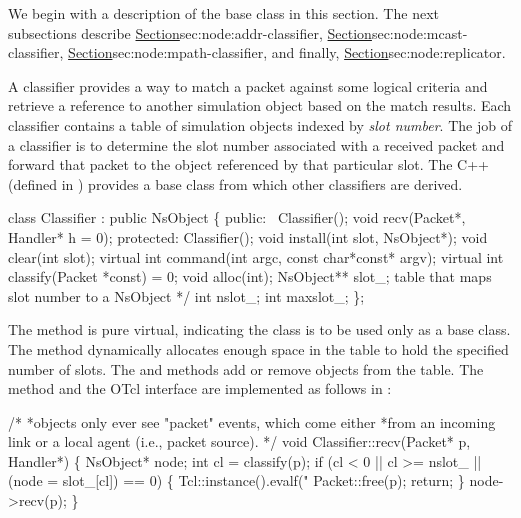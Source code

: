 {We begin with a description of the base class in this section.
The next subsections describe
\href{the address classifier}{Section}{sec:node:addr-classifier},
\href{the multicast classifier}{Section}{sec:node:mcast-classifier},
\href{the multipath classifier}{Section}{sec:node:mpath-classifier}, and
finally, \href{the replicator}{Section}{sec:node:replicator}.

A classifier provides a way to match a packet against some
logical criteria and retrieve a reference to another simulation
object based on the match results.
Each classifier contains a table of simulation objects indexed
by {\em slot number}.
The job of a classifier is to determine the slot number associated
with a received packet and forward that packet to the
object referenced by that particular slot.
The C++ 
(defined in )
provides a base class from which other classifiers are derived.
\begin{program}
        class Classifier : public NsObject \{
        public:
                ~Classifier();
                void recv(Packet*, Handler* h = 0);
         protected:
                Classifier();
                void install(int slot, NsObject*);
                void clear(int slot);
                virtual int command(int argc, const char*const* argv);
                virtual int classify(Packet *const) = 0;
                void alloc(int);
                NsObject** slot_;       \* table that maps slot number to a NsObject */
                int nslot_;
                int maxslot_;
        \};
\end{program}
The  method is pure virtual, indicating the
class  is to be used only as a base class.
The  method dynamically allocates enough space
in the table to hold the specified number of slots.
The  and  methods
add or remove objects from the table.
The  method and the OTcl interface are implemented
as follows in :
\begin{program}
        /*
         *{\cf objects only ever see "packet" events, which come either}
         *{\cf from an incoming link or a local agent (i.e., packet source).}
         */
        void Classifier::recv(Packet* p, Handler*)
        \{
                NsObject* node;
                int cl = classify(p);
                if (cl < 0 || cl >= nslot_ || (node = slot_[cl]) == 0) \{
                        Tcl::instance().evalf("%
                        Packet::free(p);
                        return;
                \}
                node->recv(p);
        \}


\end{program}}
